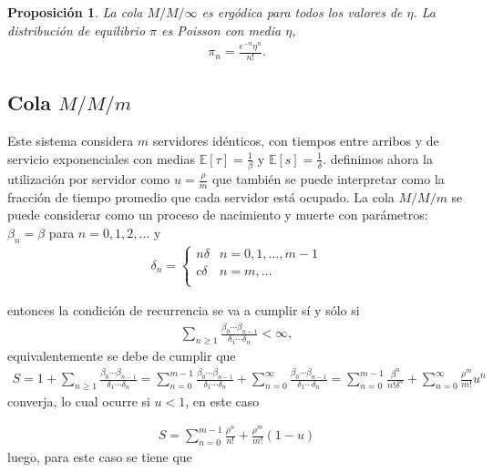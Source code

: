 \documentclass{article}
\newtheorem{Prop}{Proposición}[section]
\newcommand{\esp}{\mathbb{E}}
\numberwithin{equation}{section}
\begin{document}
\begin{Prop}
La cola $M/M/\infty$ es erg\'odica para todos los valores de $\eta$. La distribuci\'on de equilibrio $\pi$ es Poisson con media $\eta$,
\begin{eqnarray}
\pi_{n}=\frac{e^{-n}\eta^{n}}{n!}.
\end{eqnarray}
\end{Prop}
\subsection*{Cola $M/M/m$}

Este sistema considera $m$ servidores id\'enticos, con tiempos entre arribos y de servicio exponenciales con medias $\esp\left[\tau\right]=\frac{1}{\beta}$ y $\esp\left[s\right]=\frac{1}{\delta}$. definimos ahora la utilizaci\'on por servidor como $u=\frac{\rho}{m}$ que tambi\'en se puede interpretar como la fracci\'on de tiempo promedio que cada servidor est\'a ocupado. La cola $M/M/m$ se puede considerar como un proceso de nacimiento y muerte con par\'ametros: $\beta_{n}=\beta$ para $n=0,1,2,\ldots$ y
\begin{eqnarray}
\delta_{n}=\left\{\begin{array}{cc}
n\delta & n=0,1,\ldots,m-1\\
c\delta & n=m,\ldots\\
\end{array}\right.
\end{eqnarray}

entonces  la condici\'on de recurrencia se va a cumplir s\'i y s\'olo si 
\begin{eqnarray}
\sum_{n\geq1}\frac{\beta_{0}\cdots\beta_{n-1}}{\delta_{1}\cdots\delta_{n}}<\infty,
\end{eqnarray}
equivalentemente se debe de cumplir que
\begin{eqnarray}
S=1+\sum_{n\geq1}\frac{\beta_{0}\cdots\beta_{n-1}}{\delta_{1}\cdots\delta_{n}}=\sum_{n=0}^{m-1}\frac{\beta_{0}\cdots\beta_{n-1}}{\delta_{1}\cdots\delta_{n}}+\sum_{n=0}^{\infty}\frac{\beta_{0}\cdots\beta_{n-1}}{\delta_{1}\cdots\delta_{n}}=\sum_{n=0}^{m-1}\frac{\beta^{n}}{n!\delta^{n}}+\sum_{n=0}^{\infty}\frac{\rho^{m}}{m!}u^{n}
\end{eqnarray}
converja, lo cual ocurre si $u<1$, en este caso

\begin{eqnarray}
S=\sum_{n=0}^{m-1}\frac{\rho^{n}}{n!}+\frac{\rho^{m}}{m!}\left(1-u\right)
\end{eqnarray}
luego, para este caso se tiene que
\end{document}

